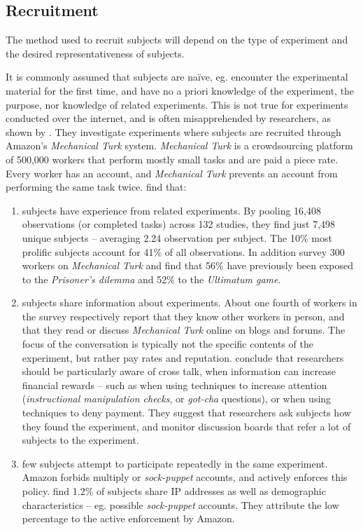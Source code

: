 \documentclass[preprint, 12pt]{elsarticle}
\begin{document}
\subsection{Recruitment}

The method used to recruit subjects will depend on the type of experiment and the desired representativeness of subjects. 

It is commonly assumed that subjects are naïve, eg. encounter the experimental material for the first time, and have no a priori knowledge of the experiment, the purpose, nor knowledge of related experiments. This is not true for experiments conducted over the internet, and is often misapprehended by researchers, as shown by \citet*{Chandler_Mueller_Paolacci_2014}. They investigate experiments where subjects are recruited through Amazon's \emph{Mechanical Turk} system. \emph{Mechanical Turk} is a crowdsourcing platform of 500,000 workers that perform mostly small tasks and are paid a piece rate. Every worker has an account, and \emph{Mechanical Turk} prevents an account from performing the same task twice. \cite{Chandler_Mueller_Paolacci_2014} find that: 

\begin{enumerate}
\item subjects have experience from related experiments. By pooling 16,408 observations (or completed tasks) across 132 studies, they find just 7,498 unique subjects -- averaging 2.24 observation per subject. The 10\% most prolific subjects account for 41\% of all observations. In addition \cite{Chandler_Mueller_Paolacci_2014} survey 300 workers on \emph{Mechanical Turk} and find that 56\% have previously been exposed to the \emph{Prisoner's dilemma} and 52\% to the \emph{Ultimatum game}. 
\item subjects share information about experiments. About one fourth of workers in the \cite{Chandler_Mueller_Paolacci_2014} survey respectively report that they know other workers in person, and that they read or discuss \emph{Mechanical Turk} online on blogs and forums. The focus of the conversation is typically not the specific contents of the experiment, but rather pay rates and reputation. \cite{Chandler_Mueller_Paolacci_2014} conclude that researchers should be particularly aware of cross talk, when information can increase financial rewards -- such as when using techniques to increase attention (\emph{instructional manipulation checks}, or \emph{got-cha} questions), or when using techniques to deny payment. They suggest that researchers ask subjects how they found the experiment, and monitor discussion boards that refer a lot of subjects to the experiment.
\item few subjects attempt to participate repeatedly in the same experiment. Amazon forbids multiply or \emph{sock-puppet} accounts, and actively enforces this policy. \cite{Chandler_Mueller_Paolacci_2014} find 1.2\% of subjects share IP addresses as well as demographic characteristics -- eg. possible \emph{sock-puppet} accounts. They attribute the low percentage to the active enforcement by Amazon.
\end{enumerate}
\end{document}
